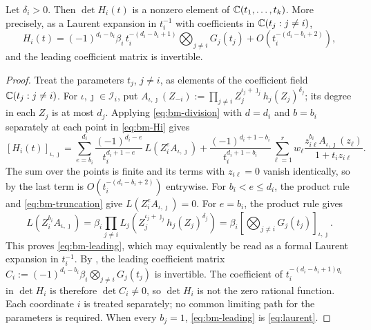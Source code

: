 \begin{lemma}\label{lem:bm-Hi}
Let $\delta_i>0$. Then $\det H_i(t)$ is a nonzero element of
$\mathbb C(t_1,\ldots,t_k)$. More precisely, as a Laurent expansion in
$t_i^{-1}$ with coefficients in $\mathbb C(t_j:j\ne i)$,
\begin{equation}\label{eq:bm-leading}
H_i(t)=(-1)^{d_i-b_i}\beta_i\,t_i^{-(d_i-b_i+1)}
\bigotimes_{j\ne i}G_j(t_j)+O\!\left(t_i^{-(d_i-b_i+2)}\right),
\end{equation}
and the leading coefficient matrix is invertible.
\end{lemma}
\begin{proof}
Treat the parameters $t_j$, $j\ne i$, as elements of the coefficient
field $\mathbb C(t_j:j\ne i)$. For $\iota,\jmath\in\mathcal I_i$, put
$A_{\iota,\jmath}(Z_{-i}):=
\prod_{j\ne i}Z_j^{\iota_j+\jmath_j}h_j(Z_j)^{\delta_j}$;
its degree in each $Z_j$ is at most $d_j$. Applying
\eqref{eq:bm-division} with $d=d_i$ and $b=b_i$ separately at each
point in \eqref{eq:bm-Hi} gives
\begin{equation}\label{eq:bm-expanded}
[H_i(t)]_{\iota,\jmath}
=\sum_{e=b_i}^{d_i}\frac{(-1)^{d_i-e}}{t_i^{d_i+1-e}}\,
L\!\left(Z_i^{e}A_{\iota,\jmath}\right)
+\frac{(-1)^{d_i+1-b_i}}{t_i^{d_i+1-b_i}}
\sum_{\ell=1}^r w_\ell
\frac{z_{i\ell}^{b_i}A_{\iota,\jmath}(z_\ell)}{1+t_iz_{i\ell}}.
\end{equation}
The sum over the points is finite and its terms with $z_{i\ell}=0$
vanish identically, so by  the last term is
$O(t_i^{-(d_i-b_i+2)})$ entrywise. For $b_i<e\le d_i$, the product
rule and \eqref{eq:bm-truncation} give $L(Z_i^eA_{\iota,\jmath})=0$.
For $e=b_i$, the product rule gives
\[
L\!\left(Z_i^{b_i}A_{\iota,\jmath}\right)
=\beta_i\prod_{j\ne i}
L_j\!\left(Z_j^{\iota_j+\jmath_j}h_j(Z_j)^{\delta_j}\right)
=\beta_i\left[\bigotimes_{j\ne i}G_j(t_j)\right]_{\iota,\jmath}.
\]
This proves \eqref{eq:bm-leading}, which may equivalently be read as a
formal Laurent expansion in $t_i^{-1}$. By , the
leading coefficient matrix
$C_i:=(-1)^{d_i-b_i}\beta_i\bigotimes_{j\ne i}G_j(t_j)$ is invertible.
The coefficient of $t_i^{-(d_i-b_i+1)q_i}$ in $\det H_i$ is therefore
$\det C_i\ne0$, so $\det H_i$ is not the zero rational function. Each
coordinate $i$ is treated separately; no common limiting path for the
parameters is required. When every $b_j=1$, \eqref{eq:bm-leading} is
\eqref{eq:laurent}.
\end{proof}


